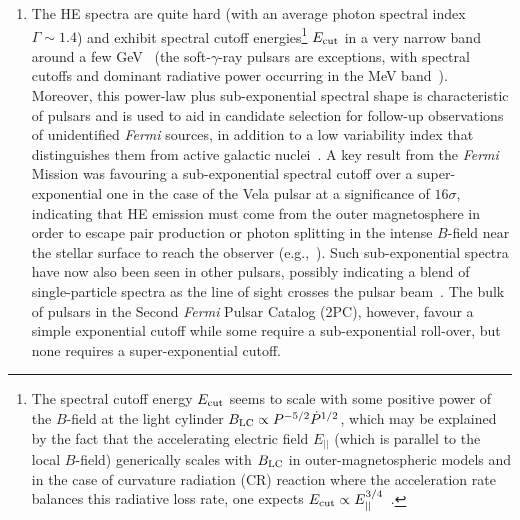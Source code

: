 \documentclass{PoS}
\begin{document}
\begin{enumerate}
  \item The HE spectra are quite hard (with an average photon spectral index $\Gamma\sim1.4$) and exhibit spectral cutoff energies\footnote{The spectral cutoff energy $E_{\rm cut}$ seems to scale with some positive power of the $B$-field at the light cylinder $B_{\rm LC}\propto P^{-5/2}\dot{P}^{1/2}$, which may be explained by the fact that the accelerating electric field $E_{||}$ (which is parallel to the local $B$-field) generically scales with $B_{\rm LC}$ in outer-magnetospheric models and in the case of curvature radiation (CR) reaction where the acceleration rate balances this radiative loss rate, one expects $E_{\rm cut}\propto E_{||}^{3/4}$~\cite{2PC}.} $E_{\rm cut}$ in a very narrow band around a few GeV~\cite{2PC} (the soft-$\gamma$-ray pulsars are exceptions, with spectral cutoffs and dominant radiative power occurring in the MeV band~\cite{Kuiper15}). Moreover, this power-law plus sub-exponential spectral shape is characteristic of pulsars and is used to aid in candidate selection for follow-up observations of unidentified \textit{Fermi} sources, in addition to a low variability index that distinguishes them from active galactic nuclei~\cite{Acero13b}. A key result from the \textit{Fermi} Mission was favouring a sub-exponential spectral cutoff over a super-exponential one in the case of the Vela pulsar at a significance of $16\sigma$, indicating that HE emission must come from the outer magnetosphere in order to escape pair production or photon splitting in the intense $B$-field near the stellar surface to reach the observer (e.g.,~\cite{Story14}). Such sub-exponential spectra have now also been seen in other pulsars, possibly indicating a blend of single-particle spectra as the line of sight crosses the pulsar beam~\cite{Vela2,Celik11}. The bulk of pulsars in the Second \textit{Fermi} Pulsar Catalog (2PC), however, favour a simple exponential cutoff while some require a sub-exponential roll-over, but none requires a super-exponential cutoff.

\end{enumerate}
\end{document}
